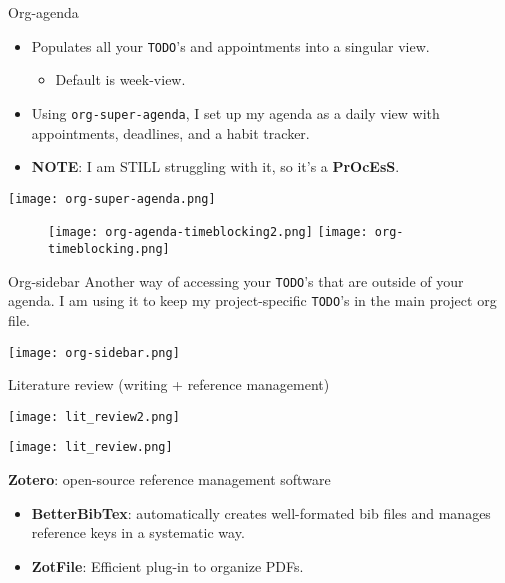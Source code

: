 \documentclass[presentation,xcolor=table]{beamer}
\begin{document}
\begin{frame}{Org-agenda}
 \begin{itemize}
\item Populates all your \texttt{TODO}'s and appointments into a singular view.
\begin{itemize}
\item Default is week-view.
\end{itemize}
\item Using \texttt{org-super-agenda}, I set up my agenda as a daily view with appointments, deadlines, and a habit tracker.
\item \textbf{NOTE}: I am STILL struggling with it, so it's a \textbf{PrOcEsS}.
\end{itemize}

\begin{center}
\texttt{[image: org-super-agenda.png]}
\end{center}

\centering
\begin{figure}
\texttt{[image: org-agenda-timeblocking2.png]}
\texttt{[image: org-timeblocking.png]}
\end{figure}
\end{frame}


\begin{frame}[label={sec:org0e851ba},fragile]{Org-sidebar}
 Another way of accessing your \texttt{TODO}'s that are outside of your agenda. I am using it to keep my project-specific \texttt{TODO}'s in the main project org file.


\begin{center}
\texttt{[image: org-sidebar.png]}
\end{center}
\end{frame}

\begin{frame}[allowframebreaks]{Literature review (writing + reference management)}
\begin{center}
\texttt{[image: lit\_review2.png]}
\end{center}

\begin{center}
\texttt{[image: lit\_review.png]}
\end{center}

\framebreak

\textbf{Zotero}: open-source reference management software
\begin{itemize}
\item \textbf{BetterBibTex}: automatically creates well-formated bib files and manages reference keys in a systematic way.
\item \textbf{ZotFile}: Efficient plug-in to organize PDFs.
\end{itemize}
\end{frame}
\end{document}
